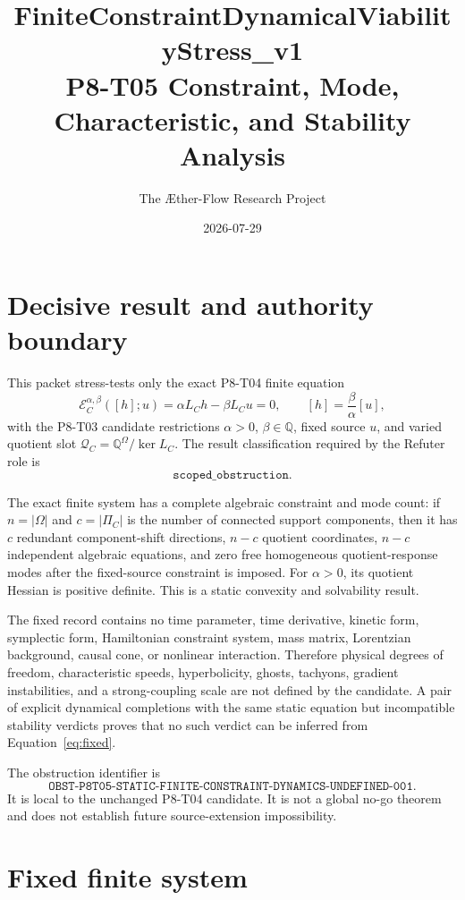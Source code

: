 \documentclass[11pt]{article}
\title{FiniteConstraintDynamicalViabilityStress\_v1\\
P8-T05 Constraint, Mode, Characteristic, and Stability Analysis}
\author{The \AE ther-Flow Research Project}
\date{2026-07-29}
\newcommand{\Q}{\mathbb Q}
\newcommand{\Qspace}{\mathcal Q_C}
\newcommand{\Eop}{\mathcal E_C^{\alpha,\beta}}
\begin{document}
\sloppy
\maketitle

\section{Decisive result and authority boundary}

This packet stress-tests only the exact P8-T04 finite equation
\begin{equation}
 \Eop([h];u)=\alpha L_Ch-\beta L_Cu=0,
 \qquad
 [h]=\frac{\beta}{\alpha}[u],
 \label{eq:fixed}
\end{equation}
with the P8-T03 candidate restrictions \(\alpha>0\), \(\beta\in\Q\),
fixed source \(u\), and varied quotient slot
\(\Qspace=\Q^\Omega/\ker L_C\).  The result classification required by the
Refuter role is
\[
 \boxed{\texttt{scoped\_obstruction}}.
\]

The exact finite system has a complete algebraic constraint and mode count:
if \(n=|\Omega|\) and \(c=|\Pi_C|\) is the number of connected support
components, then it has \(c\) redundant component-shift directions,
\(n-c\) quotient coordinates, \(n-c\) independent algebraic equations, and
zero free homogeneous quotient-response modes after the fixed-source
constraint is imposed.  For \(\alpha>0\), its quotient Hessian is positive
definite.  This is a static convexity and solvability result.

The fixed record contains no time parameter, time derivative, kinetic form,
symplectic form, Hamiltonian constraint system, mass matrix, Lorentzian
background, causal cone, or nonlinear interaction.  Therefore physical
degrees of freedom, characteristic speeds, hyperbolicity, ghosts, tachyons,
gradient instabilities, and a strong-coupling scale are not defined by the
candidate.  A pair of explicit dynamical completions with the same static
equation but incompatible stability verdicts proves that no such verdict can
be inferred from Equation~\eqref{eq:fixed}.

The obstruction identifier is
\[
\texttt{OBST-P8T05-STATIC-FINITE-CONSTRAINT-DYNAMICS-UNDEFINED-001}.
\]
It is local to the unchanged P8-T04 candidate.  It is not a global no-go
theorem and does not establish future source-extension impossibility.

\section{Fixed finite system}
\end{document}
